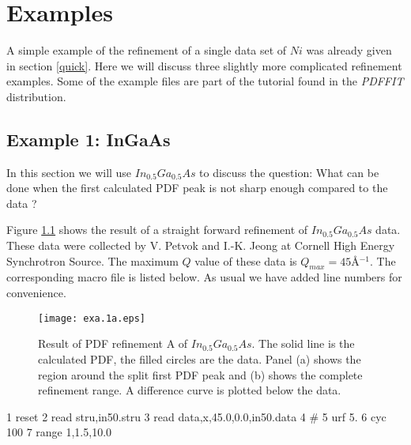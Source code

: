 
\chapter{Examples \label{exa}}

A simple example of the refinement of a single data set of $Ni$
was already given in section \ref{quick}. Here we will discuss
three slightly more complicated refinement examples. Some of the
example files are part of the tutorial found in the {\it PDFFIT}
distribution.


\section{Example 1: InGaAs\label{exa_gaas}}

In this section we will use $In_{0.5}Ga_{0.5}As$ to discuss the
question: What can be done when the first calculated PDF peak is
not sharp enough compared to the data ? \par

Figure \ref{exa_fig1a} shows the result of a straight forward
refinement of $In_{0.5}Ga_{0.5}As$ data. These data were collected
by V. Petvok and I.-K. Jeong at Cornell High Energy Synchrotron
Source. The maximum $Q$ value of these data is
$Q_{max}=45$\AA$^{-1}$. The corresponding macro file is listed
below. As usual we have added line numbers for convenience.

\begin{figure}[!htb]
   \centering
   \texttt{[image: exa.1a.eps]}
   \caption[Result of PDF refinement A of $In_{0.5}Ga_{0.5}As$]
           {Result of PDF refinement A of $In_{0.5}Ga_{0.5}As$.
            The solid line is the calculated PDF, the filled circles are
            the data. Panel (a) shows the region around the split first
            PDF peak and (b) shows the complete refinement range.
            A difference curve is plotted below the data.}
   \label{exa_fig1a}
\end{figure}

\footnotesize
\begin{MacVerbatim}
      1 reset
      2 read stru,in50.stru
      3 read data,x,45.0,0.0,in50.data
      4 #
      5 urf 5.
      6 cyc 100
      7 range 1,1.5,10.0
\end{MacVerbatim}
\normalsize

